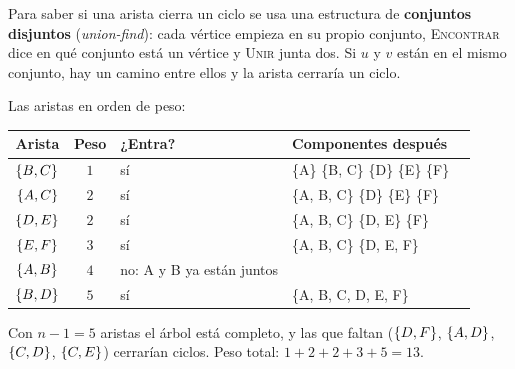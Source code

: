 \documentclass[11pt,letterpaper]{article}
\begin{document}
Para saber si una arista cierra un ciclo se usa una estructura de
\textbf{conjuntos disjuntos} (\textit{union-find}): cada vértice
empieza en su propio conjunto, \textsc{Encontrar} dice en qué conjunto
está un vértice y \textsc{Unir} junta dos. Si $u$ y $v$ están en el
mismo conjunto, hay un camino entre ellos y la arista cerraría un
ciclo.

\begin{ejemplo}
  Las aristas en orden de peso:
  \begin{center}
  \small
  \begin{tabular}{cclll}
    \toprule
    \textbf{Arista} & \textbf{Peso} & \textbf{¿Entra?}
      & \textbf{Componentes después} \\
    \midrule
    $\left\{ B, C \right\}$ & $1$ & sí & \{A\} \{B, C\} \{D\} \{E\} \{F\} \\
    $\left\{ A, C \right\}$ & $2$ & sí & \{A, B, C\} \{D\} \{E\} \{F\} \\
    $\left\{ D, E \right\}$ & $2$ & sí & \{A, B, C\} \{D, E\} \{F\} \\
    $\left\{ E, F \right\}$ & $3$ & sí & \{A, B, C\} \{D, E, F\} \\
    $\left\{ A, B \right\}$ & $4$ & no: A y B ya están juntos & \\
    $\left\{ B, D \right\}$ & $5$ & sí & \{A, B, C, D, E, F\} \\
    \bottomrule
  \end{tabular}
  \end{center}
  Con $n - 1 = 5$ aristas el árbol está completo, y las que faltan
  ($\left\{ D, F \right\}$, $\left\{ A, D \right\}$, $\left\{ C, D \right\}$, $\left\{ C, E \right\}$) cerrarían
  ciclos. Peso total: $1 + 2 + 2 + 3 + 5 = 13$.
  \begin{center}
  \end{center}
\end{ejemplo}
\end{document}
